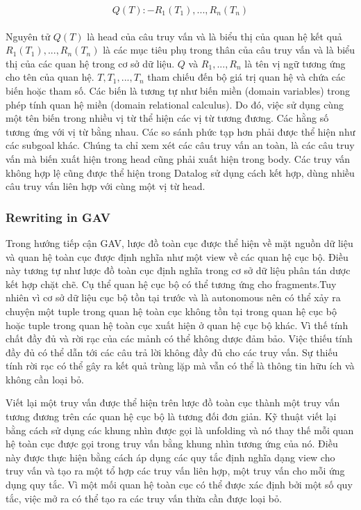 \documentclass[a4paper]{article}
\begin{document}
\[Q(T): -  R_1(T_1),...,R_n(T_n)\]
\\
Nguyên tử  $Q(T)$ là head của câu truy vấn và là biểu thị của quan hệ kết quả $R_1(T_1),...,R_n(T_n)$ là các mục tiêu phụ trong thân của câu truy vấn và là biểu thị của các quan hệ trong cơ sở dữ liệu. $Q$ và $R_1,...,R_n$ là tên vị ngữ tương ứng cho tên của quan hệ. $T,T_1,...,T_n$ tham chiếu đến bộ giá trị quan hệ và chứa các biến hoặc tham số. Các biến là tương tự như biến miền (domain variables) trong phép tính quan hệ miền (domain relational calculus). Do đó, việc sử dụng cùng một tên biến trong nhiều vị từ thể hiện các vị từ tương đương. Các hằng số tương ứng với vị từ bằng nhau. Các so sánh phức tạp hơn phải được thể hiện như các subgoal khác. Chúng ta chỉ xem xét các câu truy vấn an toàn, là các câu truy vấn mà biến xuất hiện trong head cũng phải xuất hiện trong body. Các truy vấn không hợp lệ cũng được thể hiện trong Datalog sử dụng cách kết hợp, dùng nhiều câu truy vấn liên hợp với cùng một vị từ head.
\subsubsection{Rewriting in GAV}
Trong hướng tiếp cận GAV, lược đồ toàn cục được thể hiện về mặt nguồn dữ liệu và quan hệ toàn cục được định nghĩa như một view về các quan hệ cục bộ. Điều này tương tự như lược đồ toàn cục định nghĩa trong cơ sở dữ liệu phân tán dược kết hợp chặt chẽ. Cụ thể quan hệ cục bộ có thể tương ứng cho fragments.Tuy nhiên vì cơ sở dữ liệu cục bộ tồn tại trước và là autonomous nên có thể xảy ra chuyện một tuple trong quan hệ toàn cục không tồn tại trong quan hệ cục bộ hoặc tuple trong quan hệ toàn cục xuất hiện ở quan hệ cục bộ khác. Vì thế tính chất đầy đủ và rời rạc của các mảnh có thể không dược đảm bảo. Việc thiếu tính đầy đủ có thể dẫn tới các câu trả lời không đầy đủ cho các truy vấn. Sự thiếu tính rời rạc có thể gây ra kết quả trùng lặp mà vẫn có thể là thông tin hữu ích và không cần loại bỏ.


Viết lại một truy vấn được thể hiện trên lược đồ toàn cục thành một truy vấn tương đương trên các quan hệ cục bộ là tương đối đơn giản. Kỹ thuật viết lại bằng cách sử dụng các khung nhìn được gọi là unfolding và nó thay thế mỗi quan hệ toàn cục được gọi trong truy vấn bằng khung nhìn tương ứng của nó. Điều này được thực hiện bằng cách áp dụng các quy tắc định nghĩa dạng view cho truy vấn và tạo ra một tổ hợp các truy vấn liên hợp, một truy vấn cho mỗi ứng dụng quy tắc. Vì một mối quan hệ toàn cục có thể được xác định bởi một số quy tắc, việc mở ra có thể tạo ra các truy vấn thừa cần được loại bỏ.
\end{document}

